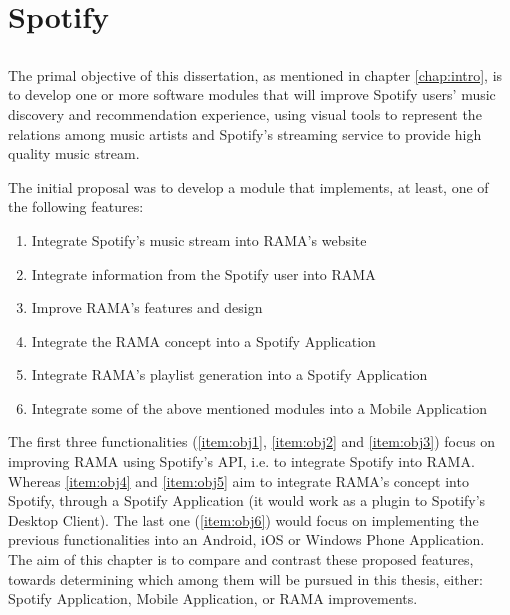 
\chapter{Spotify}
\label{chap:chap3}

\section*{}

The primal objective of this dissertation, as mentioned in chapter \ref{chap:intro}, is to develop one or more software modules that will improve Spotify users' music discovery and recommendation experience, using visual tools to represent the relations among music artists and Spotify's streaming service to provide high quality music stream.

The initial proposal was to develop a module that implements, at least, one of the following features:

\begin{enumerate}
  \label{chap3:modules}
  \item \label{item:obj1} Integrate Spotify's music stream into RAMA's website
  \item \label{item:obj2} Integrate information from the Spotify user into RAMA
  \item \label{item:obj3} Improve RAMA's features and design
  \item \label{item:obj4} Integrate the RAMA concept into a Spotify Application
  \item \label{item:obj5} Integrate RAMA's playlist generation into a Spotify Application
  \item \label{item:obj6} Integrate some of the above mentioned modules into a Mobile Application
\end{enumerate}


The first three functionalities (\ref{item:obj1}, \ref{item:obj2} and \ref{item:obj3}) focus on improving RAMA using Spotify's API, i.e. to integrate Spotify into RAMA.
Whereas \ref{item:obj4} and \ref{item:obj5} aim to integrate RAMA's concept into Spotify, through a Spotify Application (it would work as a plugin to Spotify's Desktop Client).
The last one (\ref{item:obj6}) would focus on implementing the previous functionalities into an Android, iOS or Windows Phone Application.
The aim of this chapter is to compare and contrast these proposed features, towards determining which among them will be pursued in this thesis, either: Spotify Application, Mobile Application, or RAMA improvements.

